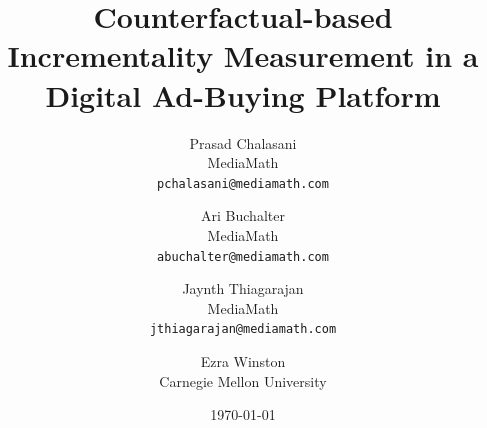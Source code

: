 \documentclass[11pt,a4paper]{article}
\theoremstyle{definition}
\theoremstyle{remark}
\theoremstyle{definition}
\theoremstyle{definition}
\theoremstyle{definition}
\theoremstyle{definition}
\theoremstyle{definition}
\theoremstyle{definition}
\begin{document}
\title{Counterfactual-based Incrementality Measurement in a Digital Ad-Buying Platform}

\author{
  Prasad Chalasani\\
  MediaMath\\
  \texttt{\small pchalasani@mediamath.com}\\
\and
  Ari Buchalter \\
  MediaMath\\
  \texttt{\small abuchalter@mediamath.com}\\
\and
  Jaynth Thiagarajan \\
  MediaMath\\
  \texttt{\small jthiagarajan@mediamath.com}\\  
\and
  Ezra Winston\\
  Carnegie Mellon University\\
}


\date{\today}
\maketitle
\end{document}
